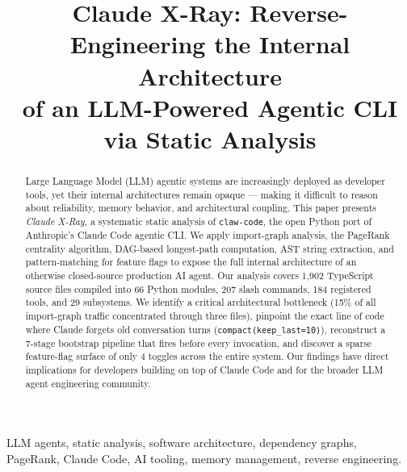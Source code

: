 \documentclass[conference]{IEEEtran}
\begin{document}

\title{Claude X-Ray: Reverse-Engineering the Internal Architecture\\
of an LLM-Powered Agentic CLI via Static Analysis}

\author{
}

\maketitle

\begin{abstract}
Large Language Model (LLM) agentic systems are increasingly deployed
as developer tools, yet their internal architectures remain opaque ---
making it difficult to reason about reliability, memory behavior, and
architectural coupling. This paper presents \emph{Claude X-Ray}, a
systematic static analysis of \texttt{claw-code}, the open Python port
of Anthropic's Claude Code agentic CLI. We apply import-graph analysis,
the PageRank centrality algorithm, DAG-based longest-path computation,
AST string extraction, and pattern-matching for feature flags to expose
the full internal architecture of an otherwise closed-source production
AI agent. Our analysis covers 1,902 TypeScript source files compiled
into 66 Python modules, 207 slash commands, 184 registered tools, and
29 subsystems. We identify a critical architectural bottleneck (15\% of
all import-graph traffic concentrated through three files), pinpoint the
exact line of code where Claude forgets old conversation turns
(\texttt{compact(keep\_last=10)}), reconstruct a 7-stage bootstrap
pipeline that fires before every invocation, and discover a sparse
feature-flag surface of only 4 toggles across the entire system. Our
findings have direct implications for developers building on top of
Claude Code and for the broader LLM agent engineering community.
\end{abstract}

\begin{IEEEkeywords}
LLM agents, static analysis, software architecture, dependency graphs,
PageRank, Claude Code, AI tooling, memory management, reverse engineering.
\end{IEEEkeywords}
\end{document}
